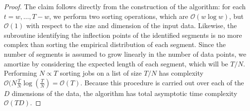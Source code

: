 \documentclass[10pt,a4paper]{amsart}
\begin{document}
\begin{proof}
    The claim follows directly from the construction of the algorithm: for each \(t = w, \dots, T - w\), we perform two sorting operations, which are \(\mathcal{O}(w\log w)\), but \(\mathcal{O}(1)\) with respect to the size and dimension of the input data. Likewise, the subroutine identifying the inflection points of the identified segments is no more complex than sorting the empirical distribution of each segment. Since the number of segments is assumed to grow linearly in the number of data points, we amortize by considering the expected length of each segment, which will be \(T/N\). Performing \(N \propto T\) sorting jobs on a list of size \(T/N\) has complexity \(\mathcal{O}(N\frac{T}{N}\log(\frac{T}{N}) = \mathcal{O}(T)\). Because this procedure is carried out over each of the \(D\) dimensions of the data, the algorithm has total asymptotic time complexity \(\mathcal{O}(TD).\)
\end{proof}
\end{document}
